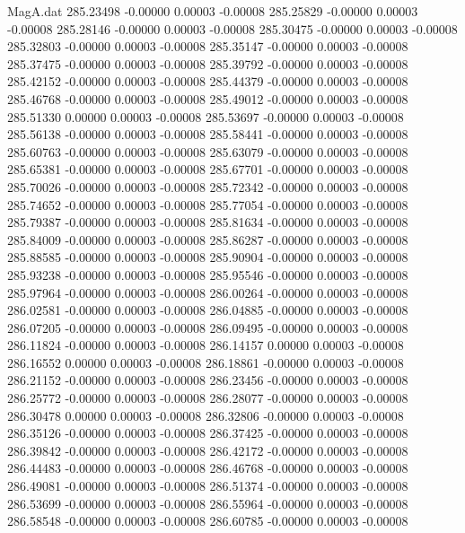 \begin{filecontents}{MagA.dat}
 285.23498   -0.00000    0.00003   -0.00008
 285.25829   -0.00000    0.00003   -0.00008
 285.28146   -0.00000    0.00003   -0.00008
 285.30475   -0.00000    0.00003   -0.00008
 285.32803   -0.00000    0.00003   -0.00008
 285.35147   -0.00000    0.00003   -0.00008
 285.37475   -0.00000    0.00003   -0.00008
 285.39792   -0.00000    0.00003   -0.00008
 285.42152   -0.00000    0.00003   -0.00008
 285.44379   -0.00000    0.00003   -0.00008
 285.46768   -0.00000    0.00003   -0.00008
 285.49012   -0.00000    0.00003   -0.00008
 285.51330    0.00000    0.00003   -0.00008
 285.53697   -0.00000    0.00003   -0.00008
 285.56138   -0.00000    0.00003   -0.00008
 285.58441   -0.00000    0.00003   -0.00008
 285.60763   -0.00000    0.00003   -0.00008
 285.63079   -0.00000    0.00003   -0.00008
 285.65381   -0.00000    0.00003   -0.00008
 285.67701   -0.00000    0.00003   -0.00008
 285.70026   -0.00000    0.00003   -0.00008
 285.72342   -0.00000    0.00003   -0.00008
 285.74652   -0.00000    0.00003   -0.00008
 285.77054   -0.00000    0.00003   -0.00008
 285.79387   -0.00000    0.00003   -0.00008
 285.81634   -0.00000    0.00003   -0.00008
 285.84009   -0.00000    0.00003   -0.00008
 285.86287   -0.00000    0.00003   -0.00008
 285.88585   -0.00000    0.00003   -0.00008
 285.90904   -0.00000    0.00003   -0.00008
 285.93238   -0.00000    0.00003   -0.00008
 285.95546   -0.00000    0.00003   -0.00008
 285.97964   -0.00000    0.00003   -0.00008
 286.00264   -0.00000    0.00003   -0.00008
 286.02581   -0.00000    0.00003   -0.00008
 286.04885   -0.00000    0.00003   -0.00008
 286.07205   -0.00000    0.00003   -0.00008
 286.09495   -0.00000    0.00003   -0.00008
 286.11824   -0.00000    0.00003   -0.00008
 286.14157    0.00000    0.00003   -0.00008
 286.16552    0.00000    0.00003   -0.00008
 286.18861   -0.00000    0.00003   -0.00008
 286.21152   -0.00000    0.00003   -0.00008
 286.23456   -0.00000    0.00003   -0.00008
 286.25772   -0.00000    0.00003   -0.00008
 286.28077   -0.00000    0.00003   -0.00008
 286.30478    0.00000    0.00003   -0.00008
 286.32806   -0.00000    0.00003   -0.00008
 286.35126   -0.00000    0.00003   -0.00008
 286.37425   -0.00000    0.00003   -0.00008
 286.39842   -0.00000    0.00003   -0.00008
 286.42172   -0.00000    0.00003   -0.00008
 286.44483   -0.00000    0.00003   -0.00008
 286.46768   -0.00000    0.00003   -0.00008
 286.49081   -0.00000    0.00003   -0.00008
 286.51374   -0.00000    0.00003   -0.00008
 286.53699   -0.00000    0.00003   -0.00008
 286.55964   -0.00000    0.00003   -0.00008
 286.58548   -0.00000    0.00003   -0.00008
 286.60785   -0.00000    0.00003   -0.00008

\end{filecontents}
